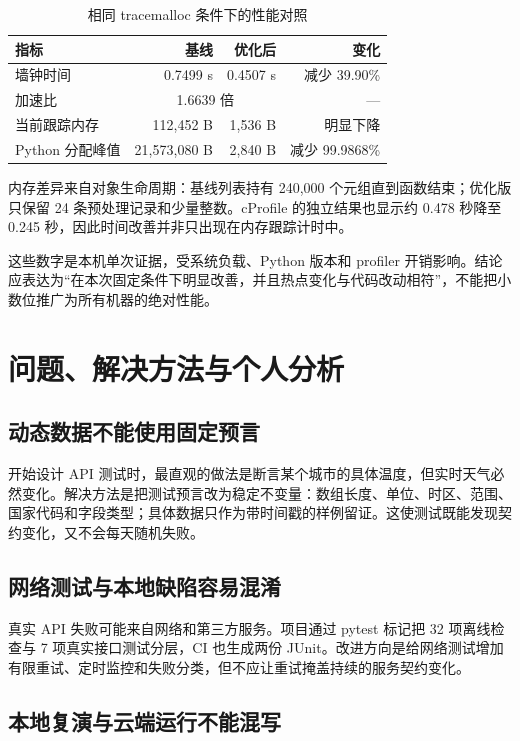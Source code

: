 \documentclass[UTF8,zihao=-4,a4paper]{ctexart}
\begin{document}
\begin{table}[htbp]
\centering
\caption{相同 tracemalloc 条件下的性能对照}
\begin{tabular}{lrrr}
\toprule
指标 & 基线 & 优化后 & 变化 \\
\midrule
墙钟时间 & 0.7499 s & 0.4507 s & 减少 39.90\% \\
加速比 & \multicolumn{2}{c}{1.6639 倍} & --- \\
当前跟踪内存 & 112,452 B & 1,536 B & 明显下降 \\
Python 分配峰值 & 21,573,080 B & 2,840 B & 减少 99.9868\% \\
\bottomrule
\end{tabular}
\end{table}

内存差异来自对象生命周期：基线列表持有 240,000 个元组直到函数结束；优化版只保留 24 条预处理记录和少量整数。cProfile 的独立结果也显示约 0.478 秒降至 0.245 秒，因此时间改善并非只出现在内存跟踪计时中。

这些数字是本机单次证据，受系统负载、Python 版本和 profiler 开销影响。结论应表达为“在本次固定条件下明显改善，并且热点变化与代码改动相符”，不能把小数位推广为所有机器的绝对性能。

\section{问题、解决方法与个人分析}

\subsection{动态数据不能使用固定预言}

开始设计 API 测试时，最直观的做法是断言某个城市的具体温度，但实时天气必然变化。解决方法是把测试预言改为稳定不变量：数组长度、单位、时区、范围、国家代码和字段类型；具体数据只作为带时间戳的样例留证。这使测试既能发现契约变化，又不会每天随机失败。

\subsection{网络测试与本地缺陷容易混淆}

真实 API 失败可能来自网络和第三方服务。项目通过 pytest 标记把 32 项离线检查与 7 项真实接口测试分层，CI 也生成两份 JUnit。改进方向是给网络测试增加有限重试、定时监控和失败分类，但不应让重试掩盖持续的服务契约变化。

\subsection{本地复演与云端运行不能混写}
\end{document}
